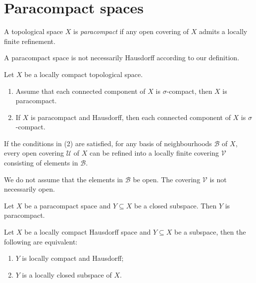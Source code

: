 \section{Paracompact spaces}

\begin{definition}
    A topological space $X$ is \emph{paracompact} if any open covering of $X$ admits a locally finite refinement.
\end{definition}
A paracompact space is not necessarily Hausdorff according to our definition.

\begin{proposition}\label{prop-paracptrefinement}
    Let $X$ be a locally compact topological space. 
    \begin{enumerate}
        \item Assume that each connected component of $X$ is $\sigma$-compact, then $X$ is paracompact.
        \item If $X$ is paracompact and Hausdorff, then each connected component of $X$ is $\sigma$-compact.
    \end{enumerate}
    If the conditions in (2) are satisfied, for any basis of neighbourhoods $\mathcal{B}$ of $X$, every open covering $\mathcal{U}$ of $X$ can be refined into a locally finite covering $\mathcal{V}$ consisting of elements in $\mathcal{B}$.
\end{proposition}
We do not assume that the elements in $\mathcal{B}$ be open. The covering $\mathcal{V}$ is not necessarily open.

\begin{proposition}
    Let $X$ be a paracompact space and $Y\subseteq X$ be a closed subspace. Then $Y$ is paracompact.
\end{proposition}

\begin{proposition}
    Let $X$ be a locally compact Hausdorff space and $Y\subseteq X$ be a subspace, then the following are equivalent:
    \begin{enumerate}
        \item $Y$ is locally compact and Hausdorff;
        \item $Y$ is a locally closed subspace of $X$.
    \end{enumerate}
    
\end{proposition}

